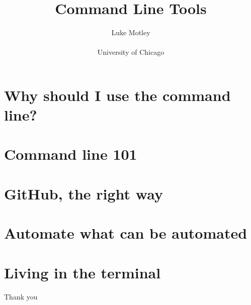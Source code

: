 \documentclass[12pt,notes=hide,aspectratio=169,mathserif,hyperref={colorlinks=true}]{beamer}
\title{Command Line Tools}
\author[Motley]{
Luke Motley \\ %
\\[1.0em]
{University of Chicago}
}
\date{{\color{blue}\monthname[\the\month] \the\year}}
\begin{document}
\begin{frame}[plain]
\setcounter{framenumber}{0}
\titlepage
\end{frame}
\section*{Why should I use the command line?}

\section{Command line 101}

\section{GitHub, the right way}

\section{Automate what can be automated}

\section{Living in the terminal}

%



\begin{frame}[plain] \begin{center}{\LARGE Thank you}\end{center} \end{frame}


\end{document}
